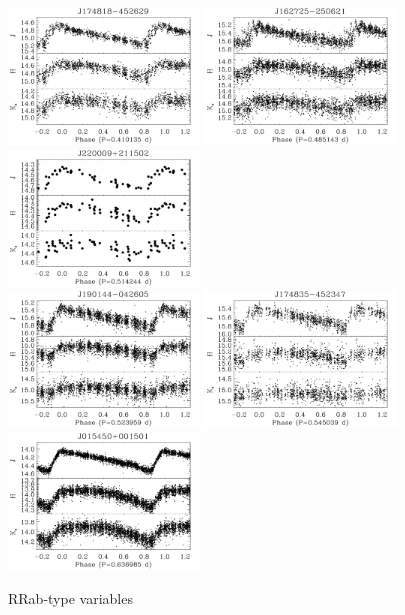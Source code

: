 \documentclass[]{emulateapj}
\begin{document}
\begin{figure}[]
\centering
\includegraphics[width=2.0in]{new_plots/rr_2}
\includegraphics[width=2.0in]{new_plots/rr_3}
\includegraphics[width=2.0in]{new_plots/rr_4}\\
\includegraphics[width=2.0in]{new_plots/rr_5}
\includegraphics[width=2.0in]{new_plots/rr_6}
\includegraphics[width=2.0in]{new_plots/rr_7}
\caption{RRab-type variables}
\label{rrshort}
\end{figure}
\end{document}
